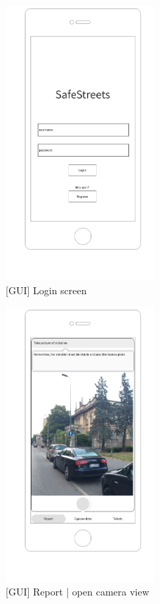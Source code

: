  \begin{figure}[H]
		\centering
      \includegraphics[width=0.5\textwidth]{GUI/login.png}
      \caption{[GUI] Login screen}   \label{fig:login}
\end{figure}


\begin{figure}[H]
		\centering
      \includegraphics[width=0.5\textwidth]{GUI/takepic.png}
      \caption{[GUI] Report | open camera view}   \label{fig:takepic}
\end{figure}


